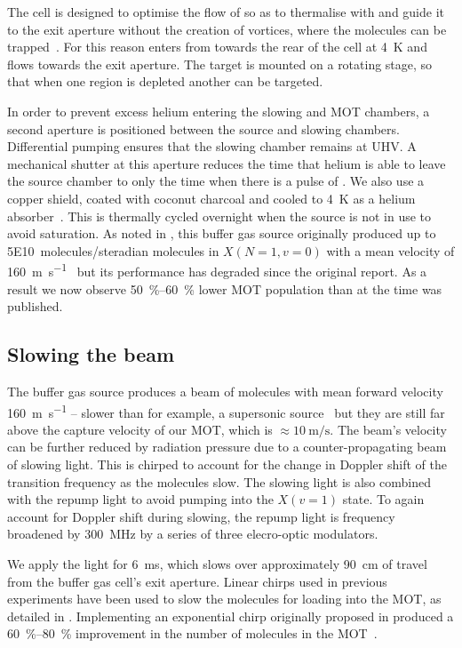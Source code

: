 The cell is designed to optimise the flow of \He{} so as to thermalise with
\CaF{} and guide it to the exit aperture without the creation of vortices,
where the molecules can be trapped~\cite{Truppe2018}. For this reason \He{}
enters from towards the rear of the cell at \SI{4}{\kelvin} and flows towards
the exit aperture.  The \Ca{} target is  mounted on a rotating stage, so that
when one region is depleted another can be targeted.

In order to prevent excess helium entering the slowing and MOT chambers, a
second aperture is positioned between the source and slowing chambers.
Differential pumping ensures that the slowing chamber remains at UHV. A
mechanical shutter at this aperture reduces the time that helium is able to
leave the source chamber to only the time when there is a pulse of \CaF{}. We
also use a copper shield, coated with coconut charcoal and cooled to
\SI{4}{\kelvin} as a helium absorber~\cite{doi:10.1116/1.574141}. This is
thermally cycled overnight when the source is not in use to avoid saturation.
As noted in , this buffer gas source originally
produced up to \SI{5E10}{molecules/steradian} molecules in $X(N=1, v=0)$ with a
mean velocity of \SI{160}{\meter\per\second}~\cite{Truppe2018} but its
performance has degraded since the original report. As a result we now observe
\SIrange{50}{60}{\percent} lower MOT population than at the time
 was published.

\subsection{Slowing the beam}

The buffer gas source produces a beam of molecules with mean forward velocity
\SI{160}{\meter\per\second} -- slower than for example, a supersonic
source~\cite{Mathavan2016} but they are still far above the capture velocity of
our MOT, which is $\approx\SI{10}{\meter\per\second}$. The beam's velocity can be
further reduced by radiation pressure due to a counter-propagating beam of
 slowing light. This is chirped to account for the change in
Doppler shift of the transition frequency as the molecules slow. The slowing
light is also combined with the  repump light to avoid pumping
into the $X(v=1)$ state. To again account for Doppler shift during slowing, the
repump light is frequency broadened by \SI{300}{\mega\hertz} by a series of
three elecro-optic modulators.

We apply the light for \SI{6}{\milli\second}, which slows over approximately
\SI{90}{\centi\meter} of travel from the buffer gas cell's exit aperture.
Linear chirps used in previous experiments have been used to slow the molecules
for loading into the MOT, as detailed in . Implementing an
exponential chirp originally proposed in   produced a
\SIrange{60}{80}{\percent} improvement in the number of molecules in the
MOT~\cite{Jurgilas2021}.

